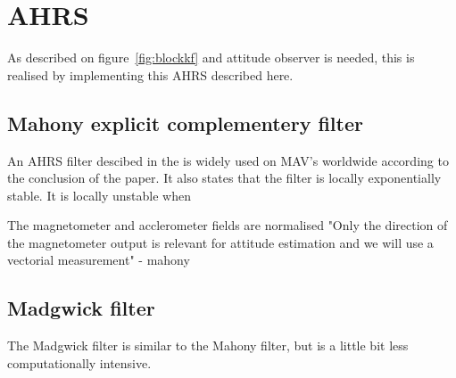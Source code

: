 \chapter{\acl{AHRS}}

\noindent As described on figure~\vref{fig:blockkf} and attitude observer is needed, this is realised by implementing this \ac{AHRS} described here.

\section{Mahony explicit complementery filter}
An \ac{AHRS} filter descibed in the \citep{mahony} is widely used on MAV's worldwide according to the conclusion of the paper. It also states that the filter is locally exponentially stable. It is locally unstable when 


The magnetometer and acclerometer fields are normalised
"Only the direction of the
magnetometer output is relevant for attitude estimation and
we will use a vectorial measurement" - mahony

\section{Madgwick filter}
The Madgwick filter is similar to the Mahony filter, but is a little bit less computationally intensive. 
